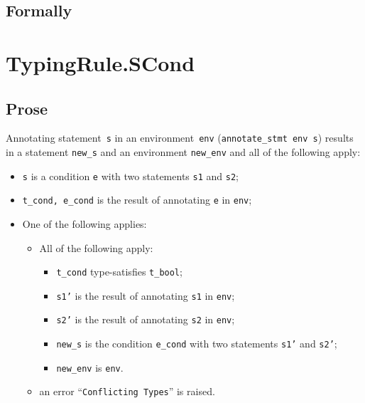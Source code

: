 \documentclass{book}
\begin{document}
\begin{emptyformal}
    \subsection{Formally}
\end{emptyformal}


\section{TypingRule.SCond \label{sec:TypingRule.SCond}}

  \subsection{Prose}
Annotating statement~\texttt{s} in an environment~\texttt{env}
(\texttt{annotate\_stmt env s}) results in a statement \texttt{new\_s} and an
environment \texttt{new\_env} and all of the following apply:
   \begin{itemize}
   \item \texttt{s} is a condition \texttt{e} with two statements \texttt{s1} and \texttt{s2};
   \item \texttt{t\_cond, e\_cond} is the result of annotating \texttt{e} in \texttt{env};
   \item One of the following applies:
     \begin{itemize}
     \item All of the following apply:
       \begin{itemize}
       \item \texttt{t\_cond} type-satisfies \texttt{t\_bool}; 
       \item \texttt{s1'} is the result of annotating \texttt{s1} in \texttt{env};
       \item \texttt{s2'} is the result of annotating \texttt{s2} in \texttt{env};
       \item \texttt{new\_s} is the condition \texttt{e\_cond} with two statements \texttt{s1'} and \texttt{s2'};
       \item \texttt{new\_env} is \texttt{env}.
       \end{itemize}
     \item an error ``\texttt{Conflicting Types}'' is raised.
     \end{itemize}
   \end{itemize}
\end{document}
